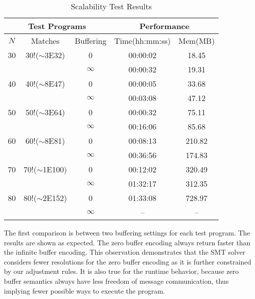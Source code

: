 \begin{table}[t]
\begin{center}
\scriptsize
\caption{Scalability Test Results}\label{table:scalability}
\begin{tabular}{|c|c|c|c|c|}
		\hline
         \multicolumn{3}{|c|}{Test Programs} & \multicolumn{2}{|c|}{Performance} \\ \hline
          $\mathit{N}$ & Matches & Buffering  & Time(hh:mm:ss) & Mem(MB) \\ \hline
          30 & 30!($\sim$3E32) & 0 & 00:00:02 & 18.45\\
               & & $\infty$ & 00:00:32 & 19.31 \\ \hline
          40 & 40!($\sim$8E47) & 0 & 00:00:05 & 33.68\\
               &  & $\infty$ & 00:03:08 & 47.12 \\ \hline
          50 & 50!($\sim$3E64) & 0 & 00:00:32 & 75.11\\
               & & $\infty$ & 00:16:06 & 85.68\\ \hline
          60 & 60!($\sim$8E81) & 0 & 00:08:13 & 210.82\\
               &  & $\infty$ & 00:36:56 & 174.83\\ \hline
          70 & 70!($\sim$1E100) & 0 & 00:12:02 & 320.49\\
               & & $\infty$ & 01:32:17 & 312.35\\ \hline
          80 & 80!($\sim$2E152) & 0 & 01:33:08 & 728.97\\
               & & $\infty$ & -- & --\\ \hline         
		\end{tabular}
\end{center}
\end{table}
The first comparison is between two buffering settings for each test program. The results are shown as expected. The zero buffer encoding always return faster than the infinite buffer encoding. This observation demonstrates that the SMT solver considers fewer resolutions for the zero buffer encoding as it is further constrained by our adjustment rules. It is also true for the runtime behavior, because zero buffer semantics always have less freedom of message communication, thus implying fewer possible ways to execute the program. 

